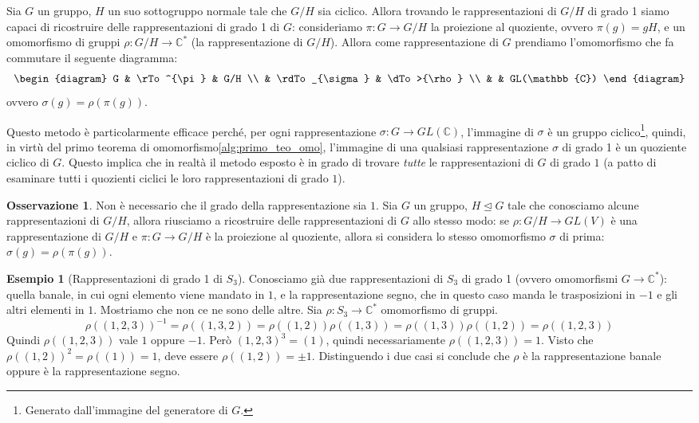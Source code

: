 \documentclass[11pt]{article}
\theoremstyle{plain}
\theoremstyle{definition}
\newtheorem{exmp}{Esempio}[section]
\newtheorem*{rem}{Osservazione}
\theoremstyle{remark}
\newcommand{\C}{\mathbb{C}}
\newcommand{\tridiag}[6]{
	  \begin{diagram}
	  #1 & \rTo^{#2}  & #3        \\
	     & \rdTo_{#6} & \dTo>{#4}   \\
	     &          & #5
	  \end{diagram}
}
\begin{document}
Sia $G$ un gruppo, $H$ un suo sottogruppo normale tale che $G/H$ sia ciclico. Allora trovando le rappresentazioni di $G/H$ di grado 1 siamo capaci di ricostruire delle rappresentazioni di grado 1 di $G$: consideriamo $\pi:G\to G/H$ la proiezione al quoziente, ovvero $\pi(g)=gH$, e un omomorfismo di gruppi $\rho:G/H\to \C^*$ (la rappresentazione di $G/H$). Allora come rappresentazione di $G$ prendiamo l'omomorfismo che fa commutare il seguente diagramma:
\[\tridiag G \pi {G/H} \rho {GL(\C)} \sigma\]
ovvero $\sigma(g)=\rho(\pi(g))$.

Questo metodo è particolarmente efficace perché, per ogni rappresentazione $\sigma:G\to GL(\C)$, l'immagine di $\sigma$ è un gruppo ciclico\footnote{Generato dall'immagine del generatore di $G$.}, quindi, in virtù del primo teorema di omomorfismo\eqref{alg:primo_teo_omo}, l'immagine di una qualsiasi rappresentazione $\sigma$ di grado 1 è un quoziente ciclico di $G$.
Questo implica che in realtà il metodo esposto è in grado di trovare \emph{tutte} le rappresentazioni di $G$ di grado $1$
(a patto di esaminare tutti i quozienti ciclici le loro rappresentazioni di grado $1$).

\begin{rem}
	Non è necessario che il grado della rappresentazione sia $1$. Sia $G$ un gruppo, $H\trianglelefteq G$ tale che conosciamo alcune rappresentazioni di $G/H$, allora riusciamo a ricostruire delle rappresentazioni di $G$ allo stesso modo: se $\rho:G/H\to GL(V)$ è una rappresentazione di $G/H$ e $\pi:G\to G/H$ è la proiezione al quoziente, allora si considera lo stesso omomorfismo $\sigma$ di prima: $\sigma(g) = \rho(\pi(g))$.
\end{rem}

\begin{exmp}[Rappresentazioni di grado 1 di $S_3$]
Conosciamo già due rappresentazioni di $S_3$ di grado 1 (ovvero omomorfismi $G\to\C^*$): quella banale, in cui ogni elemento viene mandato in $1$, 
e la rappresentazione segno, che in questo caso manda le trasposizioni in $-1$ e gli altri elementi in $1$. Mostriamo che non ce ne sono delle altre.
Sia $\rho:S_3\to\C^*$ omomorfismo di gruppi.
\[\rho((1,2,3))^{-1} = \rho((1,3,2)) = \rho((1,2))\rho((1,3)) = \rho((1,3))\rho((1,2)) = \rho((1,2,3)) \]
Quindi $\rho((1,2,3))$ vale $1$ oppure $-1$. Però $(1,2,3)^3 = (1)$, quindi necessariamente $\rho((1,2,3)) = 1$.
Visto che $\rho((1,2))^2 = \rho((1)) = 1$, deve essere $\rho((1,2)) = \pm 1$. Distinguendo i due casi si conclude che
$\rho$ è la rappresentazione banale oppure è la rappresentazione segno.
\end{exmp}
\end{document}
